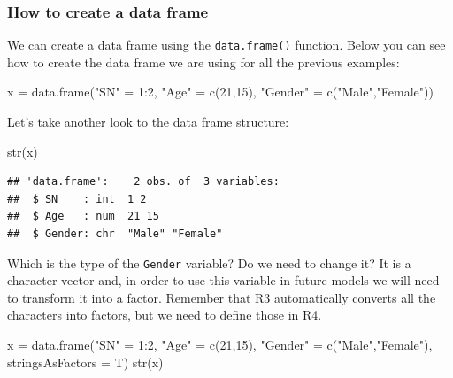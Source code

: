 \documentclass[
]{book}
\newenvironment{Shaded}{\begin{snugshade}}{\end{snugshade}}
\newcommand{\AttributeTok}[1]{\textcolor[rgb]{0.77,0.63,0.00}{#1}}
\newcommand{\DecValTok}[1]{\textcolor[rgb]{0.00,0.00,0.81}{#1}}
\newcommand{\FunctionTok}[1]{\textcolor[rgb]{0.00,0.00,0.00}{#1}}
\newcommand{\NormalTok}[1]{#1}
\newcommand{\OtherTok}[1]{\textcolor[rgb]{0.56,0.35,0.01}{#1}}
\newcommand{\SpecialCharTok}[1]{\textcolor[rgb]{0.00,0.00,0.00}{#1}}
\newcommand{\StringTok}[1]{\textcolor[rgb]{0.31,0.60,0.02}{#1}}
\theoremstyle{definition}
\theoremstyle{definition}
\theoremstyle{definition}
\theoremstyle{definition}
\theoremstyle{remark}
\begin{document}
\hypertarget{how-to-create-a-data-frame}{%
\subsubsection{How to create a data frame}\label{how-to-create-a-data-frame}}

We can create a data frame using the \texttt{data.frame()} function. Below you can see how to create the data frame we are using for all the previous examples:

\begin{Shaded}
\begin{Highlighting}[]
\NormalTok{x }\OtherTok{=} \FunctionTok{data.frame}\NormalTok{(}\StringTok{"SN"} \OtherTok{=} \DecValTok{1}\SpecialCharTok{:}\DecValTok{2}\NormalTok{, }\StringTok{"Age"} \OtherTok{=} \FunctionTok{c}\NormalTok{(}\DecValTok{21}\NormalTok{,}\DecValTok{15}\NormalTok{), }\StringTok{"Gender"} \OtherTok{=} \FunctionTok{c}\NormalTok{(}\StringTok{"Male"}\NormalTok{,}\StringTok{"Female"}\NormalTok{))}
\end{Highlighting}
\end{Shaded}

Let's take another look to the data frame structure:

\begin{Shaded}
\begin{Highlighting}[]
\FunctionTok{str}\NormalTok{(x)}
\end{Highlighting}
\end{Shaded}

\begin{verbatim}
## 'data.frame':    2 obs. of  3 variables:
##  $ SN    : int  1 2
##  $ Age   : num  21 15
##  $ Gender: chr  "Male" "Female"
\end{verbatim}

Which is the type of the \texttt{Gender} variable? Do we need to change it? It is a character vector and, in order to use this variable in future models we will need to transform it into a factor. Remember that R3 automatically converts all the characters into factors, but we need to define those in R4.

\begin{Shaded}
\begin{Highlighting}[]
\NormalTok{x }\OtherTok{=} \FunctionTok{data.frame}\NormalTok{(}\StringTok{"SN"} \OtherTok{=} \DecValTok{1}\SpecialCharTok{:}\DecValTok{2}\NormalTok{, }\StringTok{"Age"} \OtherTok{=} \FunctionTok{c}\NormalTok{(}\DecValTok{21}\NormalTok{,}\DecValTok{15}\NormalTok{), }\StringTok{"Gender"} \OtherTok{=} \FunctionTok{c}\NormalTok{(}\StringTok{"Male"}\NormalTok{,}\StringTok{"Female"}\NormalTok{), }\AttributeTok{stringsAsFactors =}\NormalTok{ T)}
\FunctionTok{str}\NormalTok{(x)}
\end{Highlighting}
\end{Shaded}
\end{document}
